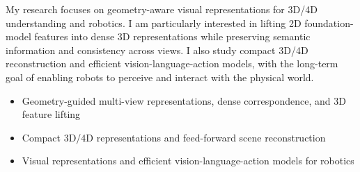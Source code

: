 \documentclass[letterpaper,11pt]{article}
\begin{document}
My research focuses on geometry-aware visual representations for 3D/4D understanding and robotics. I am particularly interested in lifting 2D foundation-model features into dense 3D representations while preserving semantic information and consistency across views. I also study compact 3D/4D reconstruction and efficient vision-language-action models, with the long-term goal of enabling robots to perceive and interact with the physical world.

\begin{itemize}
    \item Geometry-guided multi-view representations, dense correspondence, and 3D feature lifting
    \item Compact 3D/4D representations and feed-forward scene reconstruction
    \item Visual representations and efficient vision-language-action models for robotics
\end{itemize}
\end{document}
